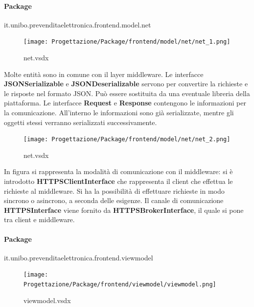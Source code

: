 \documentclass[a4paper]{article}
\begin{document}
\newpage

\paragraph{Package} it.unibo.prevenditaelettronica.frontend.model.net



\begin{figure}[H]
    \texttt{[image: Progettazione/Package/frontend/model/net/net\_1.png]}
    \centering
    \caption{net.vsdx}
\end{figure}

Molte entità sono in comune con il layer middleware. Le interfacce \textbf{JSONSerializable} e \textbf{JSONDeserializable} servono per convertire la richieste e le risposte nel formato JSON. Può essere sostituita da una eventuale libreria della piattaforma. Le interfacce \textbf{Request} e \textbf{Response} contengono le informazioni per la comunicazione. All'interno le informazioni sono già serializzate, mentre gli oggetti stessi verranno serializzati successivamente.


\begin{figure}[H]
    \texttt{[image: Progettazione/Package/frontend/model/net/net\_2.png]}
    \centering
    \caption{net.vsdx}
\end{figure}

In figura si rappresenta la modalità di comunicazione con il middleware: si è introdotto \textbf{HTTPSClientInterface} che rappresenta il client che effettua le richieste al middleware. Si ha la possibilità di effettuare richieste in modo sincrono o asincrono, a seconda delle esigenze. Il canale di comunicazione \textbf{HTTPSInterface} viene fornito da \textbf{HTTPSBrokerInterface}, il quale si pone tra client e middleware.

\newpage

\paragraph{Package} it.unibo.prevenditaelettronica.frontend.viewmodel

\begin{figure}[H]
    \texttt{[image: Progettazione/Package/frontend/viewmodel/viewmodel.png]}
    \centering
    \caption{viewmodel.vsdx}
\end{figure}
\end{document}
